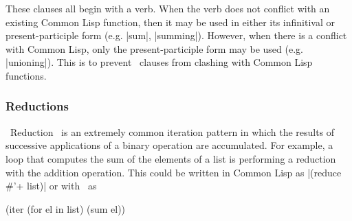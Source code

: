 These clauses all begin with a verb.  When the verb does
not conflict with an existing Common Lisp function, then it may be
used in either its infinitival or present-participle form (e.g. |sum|,
|summing|).  However, when there is a conflict with Common Lisp, only
the present-participle form may be used (e.g. |unioning|).  This is to
prevent \iter\ clauses from clashing with Common Lisp
functions.


\subsubsection{Reductions}

~Reduction~ is an extremely common iteration pattern in which
the results of successive applications of a
binary operation are accumulated.
For example, a loop that computes the sum of the
elements of a list is performing a reduction with the addition
operation.  This could be written in Common Lisp as  |(reduce \#'+
list)| or with \iter\ as
\begin{program}
(iter (for el in list)
      (sum el))
\end{program}

